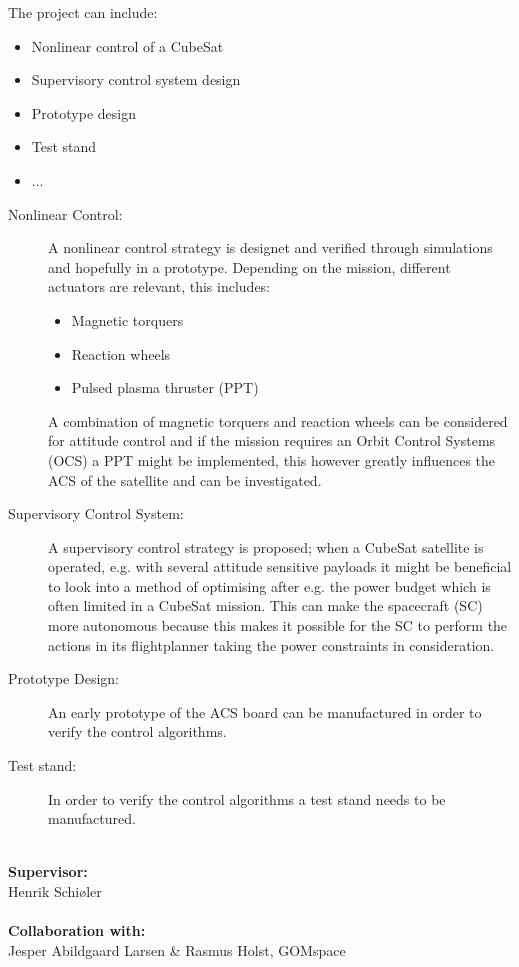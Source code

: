 The project can include:
\begin{itemize}\tightlist
  \item Nonlinear control of a CubeSat
  \item Supervisory control system design
  \item Prototype design
  \item Test stand
  \item ...
\end{itemize}

\begin{description}
  \item[Nonlinear Control:] A nonlinear control strategy is designet and verified through simulations and hopefully in a prototype. Depending on the mission, different actuators are relevant, this includes:
    \begin{itemize}\tightlist
      \item Magnetic torquers
      \item Reaction wheels
      \item Pulsed plasma thruster (PPT)
    \end{itemize}
    A combination of magnetic torquers and reaction wheels can be considered for attitude control and if the mission requires an Orbit Control Systems (OCS) a PPT might be implemented, this however greatly influences the ACS of the satellite and can be investigated.
  \item[Supervisory Control System:] A supervisory control strategy is proposed; when a CubeSat satellite is operated, e.g. with several attitude sensitive payloads it might be beneficial to look into a method of optimising after e.g. the power budget which is often limited in a CubeSat mission. This can make the spacecraft (SC) more autonomous because this makes it possible for the SC to perform the actions in its flightplanner taking the power constraints in consideration.
  \item[Prototype Design:] An early prototype of the ACS board can be manufactured in order to verify the control algorithms.
  \item[Test stand:] In order to verify the control algorithms a test stand needs to be manufactured.
\end{description}
\vspace{2cm}
~\\
\textbf{Supervisor:}\\
Henrik Schiøler\\ ~\\
\textbf{Collaboration with:}\\
Jesper Abildgaard Larsen \& Rasmus Holst, GOMspace
